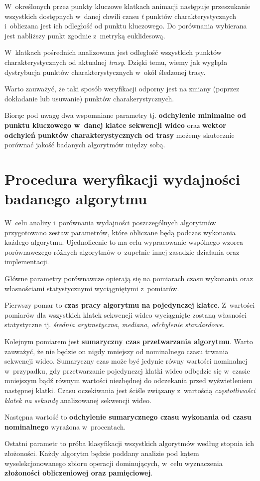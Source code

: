     W~określonych przez punkty kluczowe klatkach animacji następuje przeszukanie wszystkich dostępnych w~danej chwili czasu \textit{t} punktów charakterystycznych i~obliczana jest ich odległość od punktu kluczowego. Do porównania wybierana jest nabliższy punkt zgodnie z~metryką euklidesową.

    W~klatkach pośrednich analizowana jest odległość wszystkich punktów charakterystycznych od aktualnej \textit{trasy}. Dzięki temu, wiemy jak wygląda dystrybucja punktów charakterystycznych w~okół śledzonej trasy.

    Warto zauważyć, że taki sposób weryfikacji odporny jest na zmiany (poprzez dokładanie lub usuwanie) punktów charakerystycznych.

    Biorąc pod uwagę dwa wspomniane parametry tj. \textbf{odchylenie minimalne od punktu kluczowego w~danej klatce sekwencji wideo} oraz \textbf{wektor odchyleń punktów charakterystycznych od trasy} możemy skutecznie porównać jakość badanych algorytmów między sobą.

  \section{Procedura weryfikacji wydajności badanego algorytmu}\label{Section_Wydajnosc}

    W~celu analizy i~porównania wydajności poszczególnych algorytmów przygotowano zestaw parametrów, które obliczane będą podczas wykonania każdego algorytmu. Ujednolicenie to ma celu wypracowanie wspólnego wzorca porównawczego różnych algorytmów o~zupełnie innej zasadzie działania oraz implementacji.

    Główne parametry porównawcze opierają się na pomiarach czasu wykonania oraz własnościami statystycznymi wyciągniętymi z~pomiarów.

    Pierwszy pomar to \textbf{czas pracy algorytmu na pojedynczej klatce}. Z~wartości pomiarów dla wszystkich klatek sekwencji wideo wyciągnięte zostaną własności statystyczne tj. \textit{średnia arytmetyczna}, \textit{mediana}, \textit{odchylenie standardowe}.

    Kolejnym pomiarem jest \textbf{sumaryczny czas przetwarzania algorytmu}. Warto zauważyć, że nie będzie on nigdy mniejszy od nominalnego czasu trwania sekwencji wideo. Sumaryczny czas może być jedynie równy wartości nominalnej w~przypadku, gdy przetwarzanie pojedynczej klatki wideo odbędzie się w~czasie mniejszym bądź równym wartości niezbędnej do odczekania przed wyświetleniem następnej klatki. Czasu oczekiwania jest ściśle związany z~wartością \textit{częstotliwości klatek na sekundę} analizowanej sekwencji wideo.

    Następna wartość to \textbf{odchylenie sumarycznego czasu wykonania od czasu nominalnego} wyrażona w~procentach.

    Ostatni parametr to próba klasyfikacji wszystkich algorytmów według stopnia ich złożoności. Każdy algorytm będzie poddany analizie pod kątem wyselekcjonowanego zbioru operacji dominujących, w~celu wyznaczenia \textbf{złożoności obliczeniowej oraz pamięciowej}.